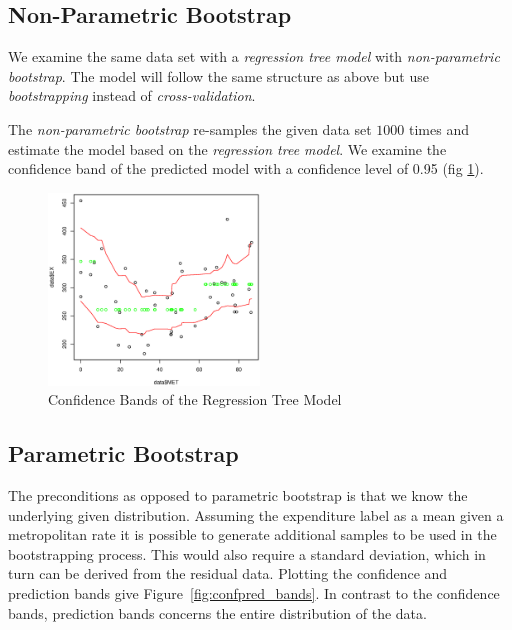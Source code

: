 \documentclass[a4paper, twocolumn]{article}
\begin{document}
    \subsection*{Non-Parametric Bootstrap}

    We examine the same data set with a \emph{regression tree model} with \emph{non-parametric bootstrap}. The model will follow the same structure as above but use \emph{bootstrapping} instead of \emph{cross-validation}.

    The \emph{non-parametric bootstrap} re-samples the given data set $1000$ times and estimate the model based on the \emph{regression tree model}. We examine the confidence band of the predicted model with a confidence level of 0.95 (fig \ref{fig:confidence_bands}).

        \begin{figure}[h!]
          \centering
          \caption{Confidence Bands of the Regression Tree Model}
          \label{fig:confidence_bands}
          \includegraphics[width=0.5\textwidth]{share/A1_nonparametric.eps}
        \end{figure}

    \subsection*{Parametric Bootstrap}

    The preconditions as opposed to parametric bootstrap is that we know the underlying given distribution. Assuming the expenditure label as a mean given a metropolitan rate it is possible to generate additional samples to be used in the bootstrapping process. This would also require a standard deviation, which in turn can be derived from the residual data. Plotting the confidence and prediction bands give Figure~\ref{fig:confpred_bands}. In contrast to the confidence bands, prediction bands concerns the entire distribution of the data.
\end{document}
